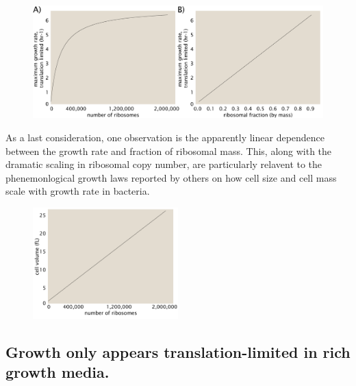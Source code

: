 \documentclass[11pt, letterpaper]{article}
\begin{document}
\begin{figure}[H]
		\centering
    \includegraphics[width=1\textwidth]{../../code/figures/SI/estimates_translation_toy_1.pdf}
  \caption{}
  \label{fig:estimates_translation_toy_1}
\end{figure}

As a last consideration, one observation is the apparently linear
dependence between the growth rate and fraction of ribosomal mass. This, along with the dramatic
scaling in ribosomal copy number, are particularly relavent to the
phenemonlogical growth laws reported by others on how cell size and cell mass
scale with growth rate in bacteria.

\begin{figure}[H]
		\centering
    \includegraphics[width=0.5\textwidth]{../../code/figures/SI/estimates_translation_volume.pdf}
  \caption{}
  \label{fig:estimates_translation_volume}
\end{figure}

\subsection{Growth only appears translation-limited in rich growth media.}

\end{document}
